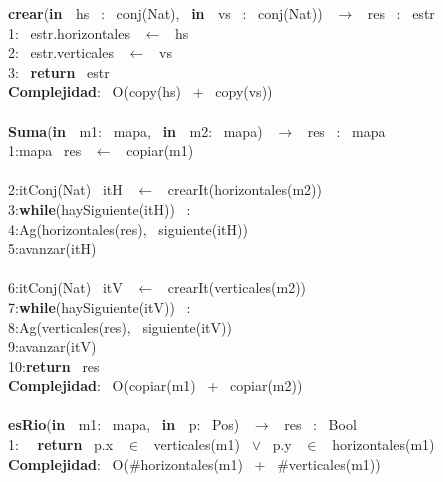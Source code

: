 \noindent \noindent\makebox[\linewidth]{\rule{\textwidth}{0.4pt}}
\textbf{crear}(\textbf{in \ }hs \ : \ conj(Nat), \ \textbf{in \ }vs \ : \ conj(Nat)) \ $\longrightarrow$ \ res \ : \ estr\\
1: \ estr.horizontales \ $\leftarrow$ \ hs\\
2: \ estr.verticales \ $\leftarrow$ \ vs \ \\
3: \ \textbf{return} \ estr\\
\textbf{Complejidad}: \ O(copy(hs) \ + \ copy(vs))\\
\noindent\makebox[\linewidth]{\rule{\textwidth}{0.4pt}}
\\
\noindent\makebox[\linewidth]{\rule{\textwidth}{0.4pt}}
\textbf{Suma}(\textbf{in \ }m1: \ mapa, \ \textbf{in \ }m2: \ mapa) \ $\longrightarrow$ \ res \ : \ mapa\\
1:\indent mapa \ res \ $\leftarrow$ \ copiar(m1)\\
\\
2:\indent itConj(Nat) \ itH \ $\leftarrow$ \ crearIt(horizontales(m2))\\
3:\indent \textbf{while}(haySiguiente(itH)) \ :\\
4:\indent \indent Ag(horizontales(res), \ siguiente(itH))\\
5:\indent \indent avanzar(itH)\\
\\
6:\indent itConj(Nat) \ itV \ $\leftarrow$ \ crearIt(verticales(m2))\\
7:\indent \textbf{while}(haySiguiente(itV)) \ :\\
8:\indent \indent Ag(verticales(res), \ siguiente(itV))\\
9:\indent \indent avanzar(itV)\\
10:\indent \textbf{return} \ res\\
\textbf{Complejidad}: \ O(copiar(m1) \ + \ copiar(m2))\\
\noindent\makebox[\linewidth]{\rule{\textwidth}{0.4pt}}
\\
\noindent\makebox[\linewidth]{\rule{\textwidth}{0.4pt}}
\textbf{esRio}(\textbf{in \ }m1: \ mapa, \ \textbf{in \ }p: \ Pos) \ $\longrightarrow$ \ res \ : \ Bool\\
1: \  \ \textbf{return} \ p.x \ $\in$ \ verticales(m1) \ $\vee$ \ p.y \ $\in$ \ horizontales(m1)\\
\textbf{Complejidad}: \ O($ \# $horizontales(m1) \ + \ $ \# $verticales(m1))\\
\noindent\makebox[\linewidth]{\rule{\textwidth}{0.4pt}}
